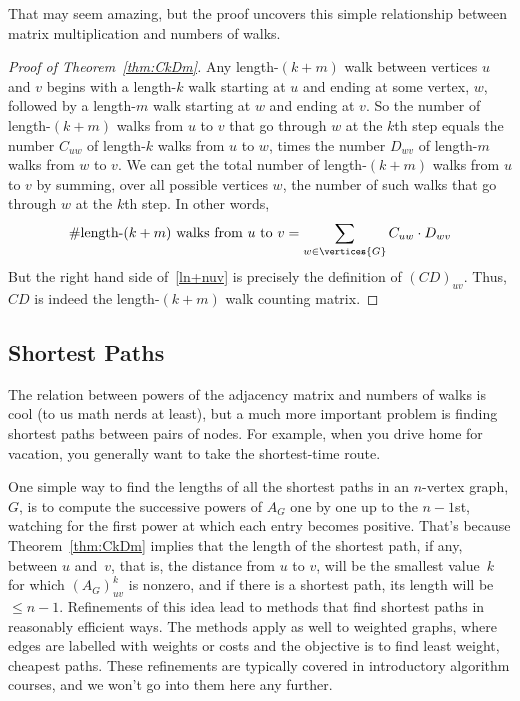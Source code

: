 That may seem amazing, but the proof uncovers this simple relationship
between matrix multiplication and numbers of walks.

\begin{editingnotes}
\end{editingnotes}

\begin{proof}[Proof of Theorem~\ref{thm:CkDm}]
  Any length-$(k+m)$ walk between vertices $u$ and $v$ begins with a
  length-$k$ walk starting at $u$ and ending at some vertex, $w$,
  followed by a length-$m$ walk starting at $w$ and ending at $v$.  So
  the number of length-$(k+m)$ walks from $u$ to $v$ that go through
  $w$ at the $k$th step equals the number $C_{uw}$ of length-$k$ walks
  from $u$ to $w$, times the number $D_{wv}$ of length-$m$ walks from
  $w$ to $v$.  We can get the total number of length-$(k+m)$ walks
  from $u$ to $v$ by summing, over all possible vertices $w$, the
  number of such walks that go through $w$ at the $k$th step.  In
  other words,
\begin{equation}\label{ln+nuv}
\text{\#length-$(k+m)$ walks from $u$ to $v$} =
              \sum_{w \in \vertices{G}} C_{uw}\cdot D_{wv}
\end{equation}
But the right hand side of~\eqref{ln+nuv} is precisely the definition of
$(CD)_{uv}$.  Thus, $CD$ is indeed the length-$(k+m)$ walk counting matrix.
\end{proof}


\subsection{Shortest Paths}
The relation between powers of the adjacency matrix and numbers of
walks is cool (to us math nerds at least), but a much more important
problem is finding  shortest paths between
pairs of nodes.  For example, when you drive home for vacation, you
generally want to take the shortest-time route.

One simple way to find the lengths of all the shortest paths in an
$n$-vertex graph, $G$, is to compute the successive powers of $A_G$
one by one up to the $n-1$st, watching for the first power at which
each entry becomes positive.  That's because Theorem~\ref{thm:CkDm}
implies that the length of the shortest path, if any, between $u$
and~$v$, that is, the distance from $u$ to $v$, will be the smallest
value~$k$ for which $(A_G)_{uv}^k$ is nonzero, and if there is a
shortest path, its length will be $\leq n-1$.  Refinements of this
idea lead to methods that find shortest paths in reasonably efficient
ways.  The methods apply as well to weighted graphs, where edges are
labelled with weights or costs and the objective is to find least
weight, cheapest paths.  These refinements are typically covered in
introductory algorithm courses, and we won't go into them here any
further.

